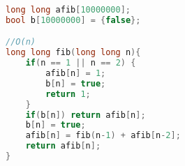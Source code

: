 \begin{lstlisting}[language=C++]
long long afib[10000000];
bool b[10000000] = {false};

//O(n)
long long fib(long long n){
	if(n == 1 || n == 2) {
		afib[n] = 1;
		b[n] = true;
		return 1;
	}
	if(b[n]) return afib[n];
	b[n] = true;
	afib[n] = fib(n-1) + afib[n-2];
	return afib[n];
}
\end{lstlisting}